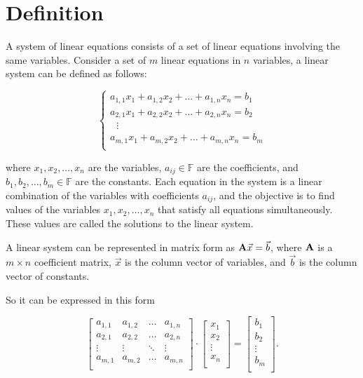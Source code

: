 \section{Definition}
A system of linear equations consists of a set of linear equations involving the same variables. Consider a set of $m$ linear equations in $n$ variables, a linear system can be defined as follows:

\[
\begin{cases}
a_{1,1}x_1 + a_{1,2}x_2 + \ldots + a_{1,n}x_n = b_1 \\
a_{2,1}x_1 + a_{2,2}x_2 + \ldots + a_{2,n}x_n = b_2 \\
\ \ \ \vdots \\
a_{m,1}x_1 + a_{m,2}x_2 + \ldots + a_{m,n}x_n = b_m \\
\end{cases}
\]

where $x_1, x_2, \ldots, x_n$ are the variables, $a_{ij} \in \mathbb F$ are the coefficients, and $b_1, b_2, \ldots, b_m \in \mathbb F$ are the constants. Each equation in the system is a linear combination of the variables with coefficients $a_{ij}$, and the objective is to find values of the variables $x_1, x_2, \ldots, x_n$ that satisfy all equations simultaneously. These values are called the solutions to the linear system.

A linear system can be represented in matrix form as $\textbf A \vec x = \vec b$, where $\textbf A$ is a $m \times n$ coefficient matrix, $\vec x$ is the column vector of variables, and $\vec b$ is the column vector of constants. 

So it can be expressed in this form

$$
\begin{bmatrix}
a_{1,1} & a_{1,2} & \ldots & a_{1,n} \\
a_{2,1} & a_{2,2} & \ldots & a_{2,n} \\
\vdots & \vdots & \ddots & \vdots \\
a_{m,1} & a_{m,2} & \ldots & a_{m,n} \\
\end{bmatrix} \cdot \begin{bmatrix}
x_1 \\
x_2 \\
\vdots \\
x_n \\
\end{bmatrix} = \begin{bmatrix}
b_1 \\
b_2 \\
\vdots \\
b_m \\
\end{bmatrix}.
$$

